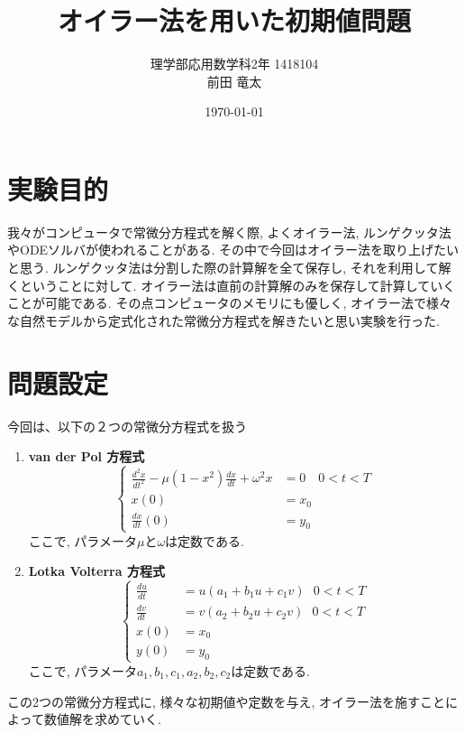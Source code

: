 \documentclass[12pt,a4paper]{jsarticle}
\begin{document}
\begin{titlepage}
\title{オイラー法を用いた初期値問題}
\author{理学部応用数学科2年 $$1418104 \\前田 竜太}
\date{\today}
\maketitle
\thispagestyle{empty}
\end{titlepage}

\section{実験目的}
我々がコンピュータで常微分方程式を解く際, よくオイラー法, ルンゲクッタ法やODEソルバが使われることがある. その中で今回はオイラー法を取り上げたいと思う. ルンゲクッタ法は分割した際の計算解を全て保存し, それを利用して解くということに対して. オイラー法は直前の計算解のみを保存して計算していくことが可能である. その点コンピュータのメモリにも優しく, オイラー法で様々な自然モデルから定式化された常微分方程式を解きたいと思い実験を行った.

\section{問題設定}
今回は、以下の２つの常微分方程式を扱う
\begin{enumerate}
	\item \textbf{van der Pol 方程式}
		\begin{equation*}
		\left\{
		\begin{aligned}
		\frac{d^{2} x}{dt^{2}} - \mu(1 - x^{2})\frac{dx}{dt} + \omega^{2} x &= 0 \quad 0 < t < T\\
		x(0) &= x_0 \\
		\frac{dx}{dt}(0) &= y_0
		\end{aligned}
		\right.
		\end{equation*}
		ここで, パラメータ$\mu$と$\omega$は定数である.
	\item \textbf{Lotka Volterra 方程式}
		\begin{equation*}
		\left\{
		\begin{aligned}
		\frac{du}{dt} &= u(a_1 + b_1u + c_1v) ~~~ 0 < t < T \\
		\frac{dv}{dt} &= v(a_2 + b_2u + c_2v) ~~~ 0 < t < T \\
		x(0) &= x_0 \\ 
		y(0) &= y_0
		\end{aligned}
		\right.
		\end{equation*}
		ここで, パラメータ$a_1, b_1, c_1, a_2, b_2, c_2$は定数である.
\end{enumerate}
この2つの常微分方程式に, 様々な初期値や定数を与え, オイラー法を施すことによって数値解を求めていく.
\end{document}
